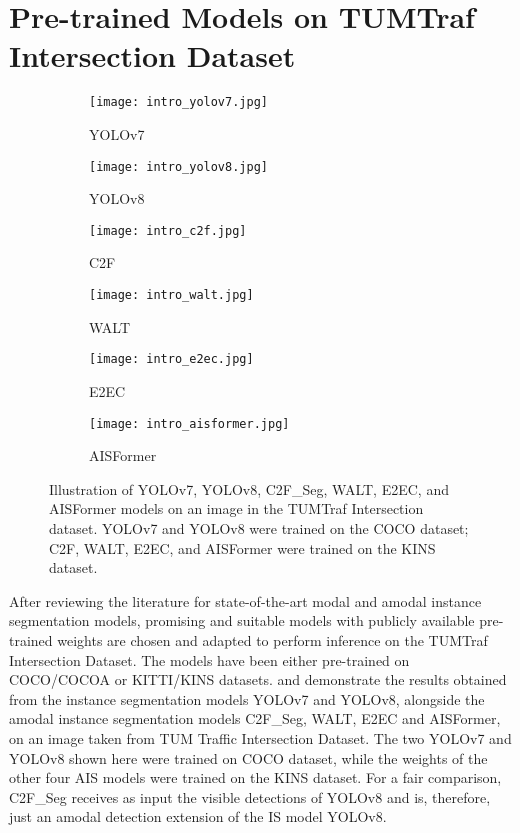 \section{Pre-trained Models on TUMTraf Intersection Dataset} \label{sec:sota_review}

\begin{figure}[htb]  
	\centering
	\begin{subfigure}{0.40\textwidth}
		\texttt{[image: intro\_yolov7.jpg]}
		\caption{YOLOv7}
	\end{subfigure}
	\begin{subfigure}{0.40\textwidth}
		\texttt{[image: intro\_yolov8.jpg]}
		\caption{YOLOv8}
	\end{subfigure}
	\begin{subfigure}{0.40\textwidth}
		\texttt{[image: intro\_c2f.jpg]}
		\caption{C2F}
	\end{subfigure}
	\begin{subfigure}{0.40\textwidth}
		\texttt{[image: intro\_walt.jpg]}
		\caption{WALT}
	\end{subfigure}
	\begin{subfigure}{0.40\textwidth}
		\texttt{[image: intro\_e2ec.jpg]}
		\caption{E2EC}
	\end{subfigure}
	\begin{subfigure}{0.40\textwidth}
		\texttt{[image: intro\_aisformer.jpg]}
		\caption{AISFormer}
	\end{subfigure}
	\caption{Illustration of YOLOv7, YOLOv8, C2F\_Seg, WALT, E2EC, and AISFormer models on an image in the TUMTraf Intersection dataset. YOLOv7 and YOLOv8 were trained on the COCO dataset; C2F, WALT, E2EC, and AISFormer were trained on the KINS dataset.}
	\label{figure:compare_sota_is_ais}
\end{figure}

After reviewing the literature for state-of-the-art modal and amodal instance segmentation models, promising and suitable models with publicly available pre-trained weights are chosen and adapted to perform inference on the TUMTraf Intersection Dataset. The models have been either pre-trained on COCO/COCOA or KITTI/KINS datasets.  and  demonstrate the results obtained from the instance segmentation models YOLOv7 and YOLOv8, alongside the amodal instance segmentation models C2F\_Seg, WALT, E2EC and AISFormer, on an image taken from TUM Traffic Intersection Dataset. The two YOLOv7 and YOLOv8 shown here were trained on COCO dataset, while the weights of the other four AIS models were trained on the KINS dataset. For a fair comparison, C2F\_Seg receives as input the visible detections of YOLOv8 and is, therefore, just an amodal detection extension of the IS model YOLOv8.

